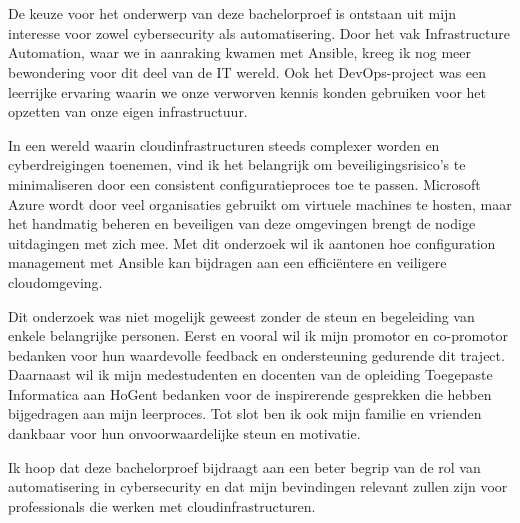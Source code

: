 
\chapter*{}%
\label{ch:voorwoord}


De keuze voor het onderwerp van deze bachelorproef is ontstaan uit mijn interesse voor zowel cybersecurity als automatisering.
Door het vak Infrastructure Automation, waar we in aanraking kwamen met Ansible, kreeg ik nog meer bewondering voor dit deel van de IT wereld.
Ook het DevOps-project was een leerrijke ervaring waarin we onze verworven kennis konden gebruiken voor het opzetten van onze eigen infrastructuur.

In een wereld waarin cloudinfrastructuren steeds complexer worden en cyberdreigingen toenemen, 
vind ik het belangrijk om beveiligingsrisico's te minimaliseren door een consistent configuratieproces toe te passen.
Microsoft Azure wordt door veel organisaties gebruikt om virtuele machines te hosten, maar het handmatig beheren en beveiligen van deze omgevingen brengt de nodige uitdagingen met zich mee.
Met dit onderzoek wil ik aantonen hoe configuration management met Ansible kan bijdragen aan een efficiëntere en veiligere cloudomgeving.

Dit onderzoek was niet mogelijk geweest zonder de steun en begeleiding van enkele belangrijke personen.
Eerst en vooral wil ik mijn promotor en co-promotor bedanken voor hun waardevolle feedback en ondersteuning gedurende dit traject.
Daarnaast wil ik mijn medestudenten en docenten van de opleiding Toegepaste Informatica aan HoGent bedanken voor de inspirerende gesprekken die hebben bijgedragen aan mijn leerproces.
Tot slot ben ik ook mijn familie en vrienden dankbaar voor hun onvoorwaardelijke steun en motivatie.

Ik hoop dat deze bachelorproef bijdraagt aan een beter begrip van de rol van automatisering in cybersecurity en 
dat mijn bevindingen relevant zullen zijn voor professionals die werken met cloudinfrastructuren.
